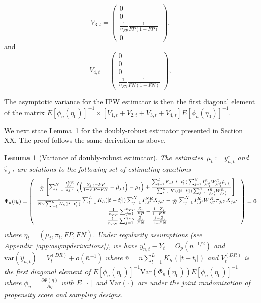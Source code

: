 \documentclass[11pt]{amsart}
\numberwithin{equation}{section}
\theoremstyle{plain}
\newtheorem{lemma}[theorem]{Lemma}
\begin{document}
$$
V_{3,t} = \left( \begin{array}{c}
0 \\
0 \\
\frac{1}{n_{FP}} \frac{1}{FP(1-FP)} \\
0
\end{array}
\right),
$$
and
$$
V_{4,t} = \left( \begin{array}{c}
0 \\
0 \\
0 \\
\frac{1}{n_{FN}} \frac{1}{FN(1-FN)}
\end{array}
\right),
$$

The asymptotic variance for the IPW estimator is then the first diagonal element of the matrix $E \left[ \phi_n (\eta_0) \right]^{-1} \times \left[ V_{1,t} + V_{2,t} + V_{3,t} + V_{4,t} \right] E \left[ \phi_n (\eta_0) \right]^{-1}$.

We next state Lemma~\ref{lemma:dr} for the doubly-robust estimator presented in Section XX.  The proof follows the same derivation as above.

\begin{lemma}[Variance of doubly-robust estimator] \normalfont
 \label{lemma:dr}
 The estimates~$\mu_t := \bar y_{n,t}^\star$ and $\hat \pi_{j,t}$
 are solutions to the following set of estimating equations
 $$
 \Phi_n (\eta_t) =
 \left (
 \begin{array}{c}
 \frac{1}{N} \left[ \sum_{j=1}^N \frac{I^{NR}_{j,t}}{\pi_{j,t}} \left( \left( \frac{Y_{j,t} - FP}{1-FP-FN} - \hat \mu_{j,t}  \right)  - \mu_t \right) + \frac{\sum_{l=1}^L K_{h} (|t - t_l^\prime|) \sum_{j=1}^N I^{R}_{j,t_l^\prime} W^{R}_{j,t_l^\prime} \hat \mu_{j,t_l^\prime}}{\sum_{l=1}^L K_{h} (|t - t_l^\prime|) \sum_{j=1}^N I^{R}_{j,t_l^\prime} W^{R}_{j,t_l^\prime}} \right] \\
 \frac{1}{N \times \sum_{l=1}^L K_{h} (|t - t_l^\prime|)} \sum_{l=1}^L K_{h} (|t - t_l^\prime|) \sum_{j=1}^N I^{NR}_{j,t^\prime} X_{j,t^\prime} - \frac{1}{N} \sum_{j = 1}^N I^{R}_{j,t^\prime} W^{R}_{j,t^\prime}  \pi_{j,t^\prime} X_{j,t^\prime}  \\
 \frac{1}{n_{FP}} \sum_{j=1}^{n_{FP}} \frac{Z_j}{FP} - \frac{1-Z_j}{1-FP} \\
 \frac{1}{n_{FN}} \sum_{j=1}^{n_{FN}} \frac{\tilde Z_j}{FN} - \frac{1-\tilde Z_j}{1-FN} \\
 \end{array}
 \right ) = {\bf 0}
 $$
 where $\eta_t = (\mu_t, \pi_t, FP, FN)$. Under regularity assumptions (see Appendix~\ref{app:asympderivations}), we have $\bar y_{n,t}^\star - \bar Y_{t} = O_p (\bar n^{-1/2})$ and $\text{var} (\hat y_{n,t}) = V_{t}^{(DR)} + o (\bar n^{-1})$ where $\bar n = n \sum_{l=1}^L K_h(|t-t_l|)$ and $V_t^{(DR)}$ is the first diagonal element of $E [\phi_n(\eta_0)]^{-1} \text{Var}(\Phi_n(\eta_0))E [\phi_n(\eta_0)]^{-1}$ where $\phi_n = \frac{\partial \Phi (\eta)}{\partial \eta}$ with $E[\cdot]$ and $\text{Var} (\cdot)$ are under the joint randomization of propensity score and sampling designs.
 \end{lemma}
\end{document}
